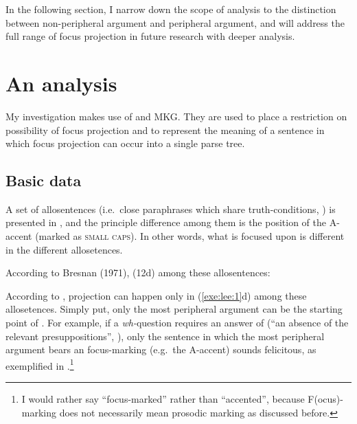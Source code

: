 In the following section, I narrow down the scope of analysis to the
distinction between non-peripheral argument and  peripheral
argument, and will address the full range of focus projection in
future research with deeper analysis.



\section{An analysis}
\label{10-4:sec:analysis}

My investigation makes use of  and MKG. They are used to place a restriction on
possibility of focus projection and to represent the meaning of a
sentence in which focus projection can occur into a single parse tree.


\subsection{Basic data}
\label{10-4:ssec:basic}

A set of allosentences (i.e.\ close paraphrases which share
truth-conditions, \citealt{lambrecht:96}) is presented in
, and the principle difference
among them is the position of the A-accent (marked as \textsc{small
  caps}). In other words, what is focused upon is
different in the different allosetences.




According to Bresnan (1971),  (12d) among these allosentences:



According to \citet{bresnan:71},  projection can happen
only in (\ref{exe:lee:1}d) among these allosetences. Simply put, only
the most peripheral argument can be the starting point of . For example, if a \textit{wh-}question requires an
answer of  (``an absence of the relevant
presuppositions'', \citealt[232]{lambrecht:96}), only the sentence in
which the most peripheral argument bears an focus-marking (e.g.\ the
A-accent) sounds felicitous, as exemplified in
.\footnote{I would rather say ``focus-marked'' rather
  than ``accented'', because F(ocus)-marking does not necessarily mean
  prosodic marking as discussed before.}


